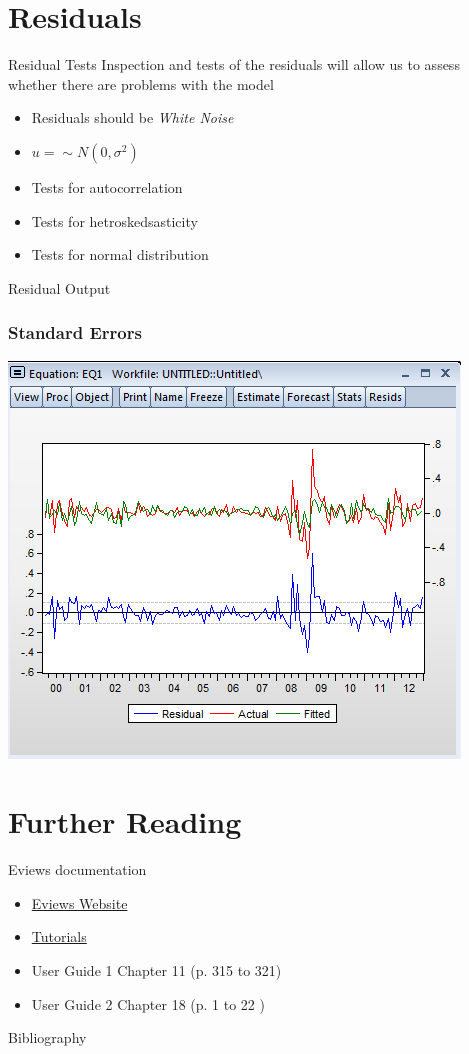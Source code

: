 \documentclass[14pt,xcolor=pdftex,dvipsnames,table]{beamer}\usepackage{graphicx, color}
\begin{document}
\section{Residuals}
\begin{frame}{Residual Tests}
Inspection and tests of the residuals will allow us to assess whether there are problems with the model
\begin{itemize}[<+-| alert@+>]
\item Residuals should be \emph{White Noise}
\item $u =\sim N(0, \sigma^2)$
\item Tests for autocorrelation
\item Tests for hetroskedsasticity
\item Tests for normal distribution
\end{itemize}
\end{frame}

\begin{frame}{Residual Output}
\graphicspath{{./Figures/}}
\frametitle{Standard Errors}
\begin{center}
\includegraphics[height = 3 in]{resid}
\end{center}
\end{frame}


\section{Further Reading}
\begin{frame}{Eviews documentation}
\begin{itemize}[<+-| alert@+>]
\item \href{http://www.eviews.com/home.html}{Eviews Website}
\item \href{http://www.eviews.com/Learning/index.html}{Tutorials}
\item User Guide 1 Chapter 11 (p. 315 to 321)
\item User Guide 2 Chapter 18 (p. 1 to 22 )
\end{itemize}
\end{frame}

\begin{frame}{Bibliography}

\end{frame}
\end{document}
